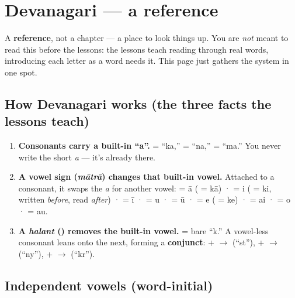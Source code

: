 
\chapter*{Devanagari --- a reference}

A \textbf{reference}, not a chapter — a place to look things up. You are \emph{not} meant to read this before the lessons: the lessons teach reading through real words, introducing each letter as a word needs it. This page just gathers the system in one spot.

\section*{How Devanagari works (the three facts the lessons teach)}

\begin{enumerate}
\raggedright
\setlength{\itemsep}{0.35em}
  \item \textbf{Consonants carry a built-in \textquotedblleft{}a\textquotedblright{}.}  = \textquotedblleft{}ka,\textquotedblright{}  = \textquotedblleft{}na,\textquotedblright{}  = \textquotedblleft{}ma.\textquotedblright{} You never write the short \emph{a} — it's already there.
  \item \textbf{A vowel sign (\emph{mātrā}) changes that built-in vowel.} Attached to a consonant, it swaps the \emph{a} for another vowel: \textbf{} = ā ( = kā) · \textbf{} = i ( = ki, written \emph{before}, read \emph{after}) · \textbf{} = ī · \textbf{} = u · \textbf{} = ū · \textbf{} = e ( = ke) · \textbf{} = ai · \textbf{} = o · \textbf{} = au.
  \item \textbf{A \emph{halant} () removes the built-in vowel.}  = bare \textquotedblleft{}k.\textquotedblright{} A vowel-less consonant leans onto the next, forming a \textbf{conjunct}:  +  $\to$  (\textquotedblleft{}st\textquotedblright{}),  +  $\to$  (\textquotedblleft{}ny\textquotedblright{}),  +  $\to$  (\textquotedblleft{}kr\textquotedblright{}).
\end{enumerate}

\section*{Independent vowels (word-initial)}

